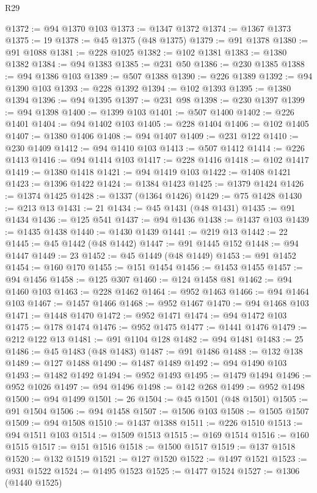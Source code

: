 \begin{lexlean}{R29}
\begin{coremodule}
@1372 := @94 @1370 @103
@1373 := @1347 @1372
@1374 := @1367 @1373
@1375 := 19
@1378 := @45 @1375 (@48 @1375)
@1379 := @91 @1378
@1380 := @91 @1088
@1381 := @228 @1025
@1382 := @102 @1381
@1383 := @1380 @1382
@1384 := @94 @1383
@1385 := @231 @50
@1386 := @230 @1385
@1388 := @94 @1386 @103
@1389 := @507 @1388
@1390 := @226 @1389
@1392 := @94 @1390 @103
@1393 := @228 @1392
@1394 := @102 @1393
@1395 := @1380 @1394
@1396 := @94 @1395
@1397 := @231 @98
@1398 := @230 @1397
@1399 := @94 @1398
@1400 := @1399 @103
@1401 := @507 @1400
@1402 := @226 @1401
@1404 := @94 @1402 @103
@1405 := @228 @1404
@1406 := @102 @1405
@1407 := @1380 @1406
@1408 := @94 @1407
@1409 := @231 @122
@1410 := @230 @1409
@1412 := @94 @1410 @103
@1413 := @507 @1412
@1414 := @226 @1413
@1416 := @94 @1414 @103
@1417 := @228 @1416
@1418 := @102 @1417
@1419 := @1380 @1418
@1421 := @94 @1419 @103
@1422 := @1408 @1421
@1423 := @1396 @1422
@1424 := @1384 @1423
@1425 := @1379 @1424
@1426 := @1374 @1425
@1428 := @1337 (@1364 @1426)
@1429 := @75 @1428
@1430 := @213 @13
@1431 := 21
@1434 := @45 @1431 (@48 @1431)
@1435 := @91 @1434
@1436 := @125 @541
@1437 := @94 @1436
@1438 := @1437 @103
@1439 := @1435 @1438
@1440 := @1430 @1439
@1441 := @219 @13
@1442 := 22
@1445 := @45 @1442 (@48 @1442)
@1447 := @91 @1445 @152
@1448 := @94 @1447
@1449 := 23
@1452 := @45 @1449 (@48 @1449)
@1453 := @91 @1452
@1454 := @160 @170
@1455 := @151 @1454
@1456 := @1453 @1455
@1457 := @94 @1456
@1458 := @125 @307
@1460 := @124 @1458 @81
@1462 := @94 @1460 @103
@1463 := @228 @1462
@1464 := @952 @1463
@1466 := @94 @1464 @103
@1467 := @1457 @1466
@1468 := @952 @1467
@1470 := @94 @1468 @103
@1471 := @1448 @1470
@1472 := @952 @1471
@1474 := @94 @1472 @103
@1475 := @178 @1474
@1476 := @952 @1475
@1477 := @1441 @1476
@1479 := @212 @122 @13
@1481 := @91 @1104 @128
@1482 := @94 @1481
@1483 := 25
@1486 := @45 @1483 (@48 @1483)
@1487 := @91 @1486
@1488 := @132 @138
@1489 := @127 @1488
@1490 := @1487 @1489
@1492 := @94 @1490 @103
@1493 := @1482 @1492
@1494 := @952 @1493
@1495 := @1479 @1494
@1496 := @952 @1026
@1497 := @94 @1496
@1498 := @142 @268
@1499 := @952 @1498
@1500 := @94 @1499
@1501 := 26
@1504 := @45 @1501 (@48 @1501)
@1505 := @91 @1504
@1506 := @94 @1458
@1507 := @1506 @103
@1508 := @1505 @1507
@1509 := @94 @1508
@1510 := @1437 @1388
@1511 := @226 @1510
@1513 := @94 @1511 @103
@1514 := @1509 @1513
@1515 := @169 @1514
@1516 := @160 @1515
@1517 := @151 @1516
@1518 := @1500 @1517
@1519 := @137 @1518
@1520 := @132 @1519
@1521 := @127 @1520
@1522 := @1497 @1521
@1523 := @931 @1522
@1524 := @1495 @1523
@1525 := @1477 @1524
@1527 := @1306 (@1440 @1525)

\end{coremodule}
\end{lexlean}
